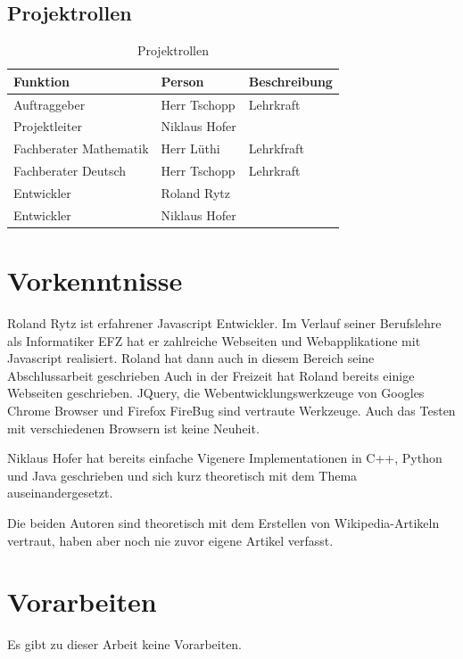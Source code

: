 \documentclass[11pt,paper=a4,final]{scrartcl}
\begin{document}
\subsection{Projektrollen}
\begin{table}[h!]
  \centering
  \begin{tabular}{|l|l|l|}
    \hline
    \bf Funktion & \bf Person & \bf Beschreibung \\ \hline
    Auftraggeber & Herr Tschopp & Lehrkraft \\ \hline
    Projektleiter & Niklaus Hofer & \\ \hline
    Fachberater Mathematik & Herr L\"uthi & Lehrkfraft \\ \hline
    Fachberater Deutsch & Herr Tschopp & Lehrkraft \\ \hline
    Entwickler & Roland Rytz & \\ \hline
    Entwickler & Niklaus Hofer & \\ \hline
  \end{tabular}
  \caption{Projektrollen}
\end{table}
\section{Vorkenntnisse}
\label{sec:vorkenntnisse}
Roland Rytz ist erfahrener Javascript Entwickler. Im Verlauf seiner Berufslehre
als Informatiker EFZ hat er zahlreiche Webseiten und Webapplikatione mit
Javascript realisiert. Roland hat dann auch in diesem Bereich seine
Abschlussarbeit geschrieben Auch in der Freizeit hat Roland bereits einige
Webseiten geschrieben. JQuery, die Webentwicklungswerkzeuge von Googles Chrome
Browser und Firefox FireBug sind vertraute Werkzeuge. Auch das Testen mit
verschiedenen Browsern ist keine Neuheit.

Niklaus Hofer hat bereits einfache Vigenere Implementationen in C++, Python und
Java geschrieben und sich kurz theoretisch mit dem Thema auseinandergesetzt.

Die beiden Autoren sind theoretisch mit dem Erstellen von Wikipedia-Artikeln
vertraut, haben aber noch nie zuvor eigene Artikel verfasst.
\section{Vorarbeiten}
\label{sec:vorarbeiten}
Es gibt zu dieser Arbeit keine Vorarbeiten.
\end{document}
